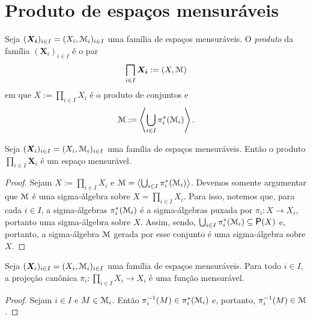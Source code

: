 \section{Produto de espaços mensuráveis}

\begin{definition}
Seja $(\bm{X_i})_{i \in I} = (X_i,\mathcal{M}_i)_{i \in I}$ uma família de espaços mensuráveis. O \emph{produto} da família $(\bm X_i)_{i \in I}$ é o par
	\begin{equation*}
	\prod_{i \in I} \bm{X_i} := (X,\mens)
	\end{equation*}
em que $X := \prod_{i \in I} X_i$ é o produto de conjuntos e
	\begin{equation*}
	\mathcal{M} := \left\langle \bigcup_{i \in I} \pi_i^*(\mathcal{M}_i) \right\rangle.
	\end{equation*}
\end{definition}

\begin{proposition}
Seja $(\bm X_i)_{i \in I} = (X_i,\mathcal{M}_i)_{i \in I}$ uma família de espaços mensuráveis. Então o produto $\prod_{i \in I} \bm X_i$ é um espaço mensurável.
\end{proposition}
\begin{proof}
Sejam $X := \prod_{i \in I} X_i$ e $\mathcal{M}=\left\langle \bigcup_{i \in I} \pi_i^*(\mathcal{M}_i) \right\rangle$. Devemos somente argumentar que $\mathcal{M}$ é uma sigma-álgebra sobre $X= \prod_{i \in I} X_i$. Para isso, notemos que, para cada $i \in I$, a sigma-álgebras $\pi_i^*(\mathcal{M}_i)$ é a sigma-álgebras puxada por $\pi_i: X \to X_i$, portanto uma sigma-álgebra sobre $X$. Assim, sendo, $\bigcup_{i \in I} \pi_i^*(\mens_i) \subseteq \p(X)$ e, portanto, a sigma-álgebra $\mathcal{M}$ gerada por esse conjunto é uma sigma-álgebra sobre $X$.
\end{proof}

\begin{proposition}
Seja $(\bm X_i)_{i \in I} = (X_i,\mathcal{M}_i)_{i \in I}$ uma família de espaços mensuráveis. Para todo $i \in I$, a projeção canônica $\pi_i: \prod_{i \in I} X_i \to X_i$ é uma função mensurável.
\end{proposition}
\begin{proof}
Sejam $i \in I$ e $M \in \mathcal{M}_i$. Então $\pi_i^{-1}(M) \in \pi_i^*(\mathcal{M}_i)$ e, portanto, $\pi_i^{-1}(M) \in \mathcal{M}$.
\end{proof}

